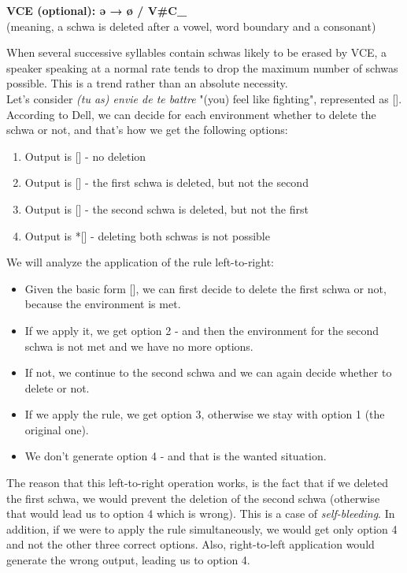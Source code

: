 \documentclass{article}
\begin{document}
\begin{center}
\textbf{VCE (optional): ə → ø / V\#C\_} \\
(meaning, a schwa is deleted after a vowel, word boundary and a consonant)
\end{center}
When several successive syllables contain schwas likely to be erased by VCE, a speaker speaking at a normal rate tends to drop the maximum number of schwas possible.  This is a trend rather than an absolute necessity. \\ 
Let's consider \textit{(tu as) envie de te battre} "(you) feel like fighting",  represented as [].
According to Dell, we can decide for each environment whether to delete the schwa or not, and that's how we get the following options:
\begin{enumerate}
  \item Output is [] - no deletion
  \item Output is [] - the first schwa is deleted, but not the second 
  \item Output is [] - the second schwa is deleted, but not the first 
  \item Output is *[] - deleting both schwas is not possible
\end{enumerate}
We will analyze the application of the rule left-to-right:
\begin{itemize}
  \item Given the basic form [],  we can first decide to delete the first schwa or not, because the environment is met.
  \item If we apply it, we get option 2 - and then the environment for the second schwa is not met and we have no more options.
  \item If not, we continue to the second schwa and we can again decide whether to delete or not.
  \item If we apply the rule, we get option 3, otherwise we stay with option 1 (the original one).
  \item We don't generate option 4 - and that is the wanted situation.
\end{itemize}
The reason that this left-to-right operation works, is the fact that if we deleted the first schwa, we would prevent the deletion of the second schwa (otherwise that would lead us to option 4 which is wrong). This is a case of \textit{self-bleeding}.
In addition, if we were to apply the rule simultaneously,  we would get only option 4 and not the other three correct options.  Also, right-to-left application would generate the wrong output, leading us to option 4. \\
\end{document}
